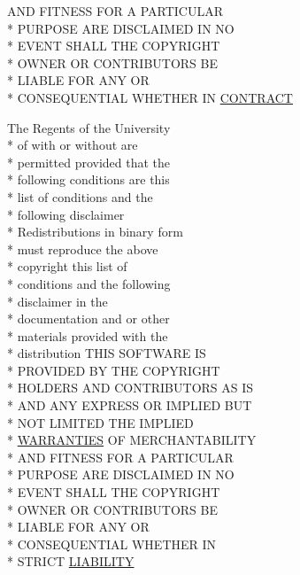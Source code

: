 \begin{DoxyCompactItemize}
A\+N\+D F\+I\+T\+N\+E\+S\+S F\+O\+R A P\+A\+R\+T\+I\+C\+U\+L\+A\+R \\*
P\+U\+R\+P\+O\+S\+E A\+R\+E D\+I\+S\+C\+L\+A\+I\+M\+E\+D I\+N N\+O \\*
E\+V\+E\+N\+T S\+H\+A\+L\+L T\+H\+E C\+O\+P\+Y\+R\+I\+G\+H\+T \\*
O\+W\+N\+E\+R O\+R C\+O\+N\+T\+R\+I\+B\+U\+T\+O\+R\+S B\+E \\*
L\+I\+A\+B\+L\+E F\+O\+R A\+N\+Y O\+R \\*
C\+O\+N\+S\+E\+Q\+U\+E\+N\+T\+I\+A\+L W\+H\+E\+T\+H\+E\+R I\+N \hyperlink{_l_i_c_e_n_s_e_a7a844151eef8cb86ee78d228151f2d5a}{C\+O\+N\+T\+R\+A\+C\+T}
\item 
The Regents of the University \\*
of with or without are \\*
permitted provided that the \\*
following conditions are this \\*
list of conditions and the \\*
following disclaimer \\*
Redistributions in binary form \\*
must reproduce the above \\*
copyright this list of \\*
conditions and the following \\*
disclaimer in the \\*
documentation and or other \\*
materials provided with the \\*
distribution T\+H\+I\+S S\+O\+F\+T\+W\+A\+R\+E I\+S \\*
P\+R\+O\+V\+I\+D\+E\+D B\+Y T\+H\+E C\+O\+P\+Y\+R\+I\+G\+H\+T \\*
H\+O\+L\+D\+E\+R\+S A\+N\+D C\+O\+N\+T\+R\+I\+B\+U\+T\+O\+R\+S A\+S I\+S \\*
A\+N\+D A\+N\+Y E\+X\+P\+R\+E\+S\+S O\+R I\+M\+P\+L\+I\+E\+D B\+U\+T \\*
N\+O\+T L\+I\+M\+I\+T\+E\+D T\+H\+E I\+M\+P\+L\+I\+E\+D \\*
\hyperlink{_l_i_c_e_n_s_e_a3f8645b457d8bdef4fd7c3549fc01039}{W\+A\+R\+R\+A\+N\+T\+I\+E\+S} O\+F M\+E\+R\+C\+H\+A\+N\+T\+A\+B\+I\+L\+I\+T\+Y \\*
A\+N\+D F\+I\+T\+N\+E\+S\+S F\+O\+R A P\+A\+R\+T\+I\+C\+U\+L\+A\+R \\*
P\+U\+R\+P\+O\+S\+E A\+R\+E D\+I\+S\+C\+L\+A\+I\+M\+E\+D I\+N N\+O \\*
E\+V\+E\+N\+T S\+H\+A\+L\+L T\+H\+E C\+O\+P\+Y\+R\+I\+G\+H\+T \\*
O\+W\+N\+E\+R O\+R C\+O\+N\+T\+R\+I\+B\+U\+T\+O\+R\+S B\+E \\*
L\+I\+A\+B\+L\+E F\+O\+R A\+N\+Y O\+R \\*
C\+O\+N\+S\+E\+Q\+U\+E\+N\+T\+I\+A\+L W\+H\+E\+T\+H\+E\+R I\+N \\*
S\+T\+R\+I\+C\+T \hyperlink{_l_i_c_e_n_s_e_a75e09f34e85911710a689d696b2b04ac}{L\+I\+A\+B\+I\+L\+I\+T\+Y}
\end{DoxyCompactItemize}



